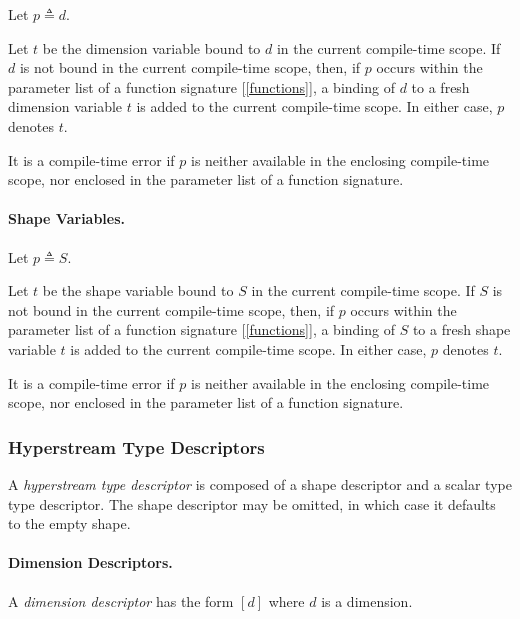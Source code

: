 \documentclass{article}
\begin{document}
 Let $p \triangleq d$.
 
 Let $t$ be the dimension variable bound to $d$ in the current compile-time scope. If $d$ is not bound in the current compile-time scope, then, if $p$ occurs within the parameter list of a function signature [\ref{functions}],  a binding of $d$ to a fresh dimension variable $t$ is added to the current compile-time scope. In either case, $p$ denotes  $t$. 

 
 It is a compile-time error if $p$ is neither available in the enclosing compile-time scope, nor enclosed in the parameter list of a function signature.
 
 \paragraph{Shape Variables.}


 Let $p \triangleq S$.
 
 Let $t$ be the shape variable bound to  $S$ in the current compile-time scope. If $S$ is not bound in the current compile-time scope, then, if $p$ occurs within the parameter list of a function signature [\ref{functions}],  a binding of  $S$ to a fresh shape variable $t$ is added to the current compile-time scope. In either case, $p$ denotes  $t$. 
 
 It is a compile-time error if $p$ is neither available in the enclosing compile-time scope, nor enclosed in the parameter list of a function signature.
 
\subsubsection{Hyperstream Type Descriptors}
\label{hyperstreamTypeDescriptors}

A {\em hyperstream type descriptor} is composed of a shape descriptor and a scalar type type descriptor. The shape descriptor may be omitted, in which case it defaults to the empty shape. 

\TypeSig{}
\HyperstreamType

\paragraph{Dimension Descriptors.}
A {\em dimension descriptor} has the form $[d]$ where $d$ is a dimension. 

\Dimension
\end{document}
